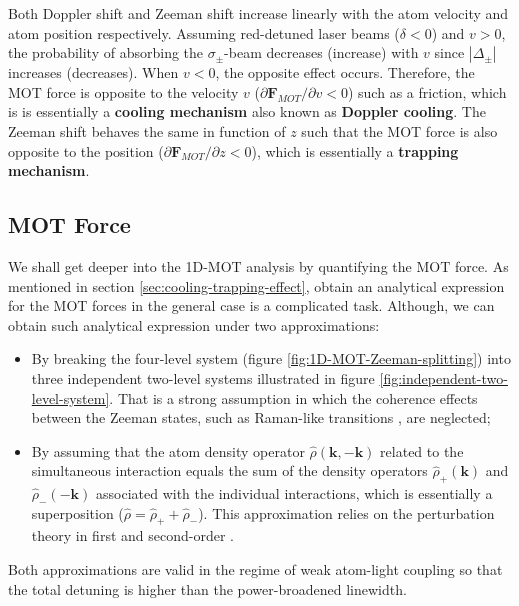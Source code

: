 Both Doppler shift and Zeeman shift increase linearly with the atom velocity and atom position respectively. Assuming red-detuned laser beams ($ \delta < 0 $) and $ v > 0 $, the probability of absorbing the $ \sigma_{\pm} $-beam decreases (increase) with $ v $ since $ |\Delta_{\pm}| $ increases (decreases). When $ v < 0 $, the opposite effect occurs. Therefore, the MOT force is opposite to the velocity $ v $ ($ \partial \mathbf{F}_{MOT} / \partial v < 0 $) such as a friction, which is is essentially a \textbf{cooling mechanism} also known as \textbf{Doppler cooling}. The Zeeman shift behaves the same in function of $ z $ such that the MOT force is also opposite to the position ($ \partial \mathbf{F}_{MOT} / \partial z < 0 $), which is essentially a \textbf{trapping mechanism}.

\subsection{MOT Force}
\label{sec:MOT-force}

We shall get deeper into the 1D-MOT analysis by quantifying the MOT force. As mentioned in section \ref{sec:cooling-trapping-effect}, obtain an analytical expression for the MOT forces in the general case is a complicated task. Although, we can obtain such analytical expression under two approximations:
\begin{itemize}
	\item By breaking the four-level system (figure \ref{fig:1D-MOT-Zeeman-splitting}) into three independent two-level systems illustrated in figure \ref{fig:independent-two-level-system}. That is a strong assumption in which the coherence effects between the Zeeman states, such as Raman-like transitions \cite[Section~9.8]{foot2005atomic}, are neglected;

	\item By assuming that the atom density operator $ \hat{\rho}(\mathbf{k}, -\mathbf{k}) $ related to the simultaneous interaction equals the sum of the density operators $ \hat{\rho}_{+}(\mathbf{k}) $ and $ \hat{\rho}_{-}(-\mathbf{k}) $ associated with the individual interactions, which is essentially a superposition ($ \hat{\rho} = \hat{\rho}_{+} + \hat{\rho}_{-} $). This approximation relies on the perturbation theory in first and second-order \cite[Chapter~7]{berman2011principles}. 
\end{itemize}

Both approximations are valid in the regime of weak atom-light coupling so that the total detuning is higher than the power-broadened linewidth.

